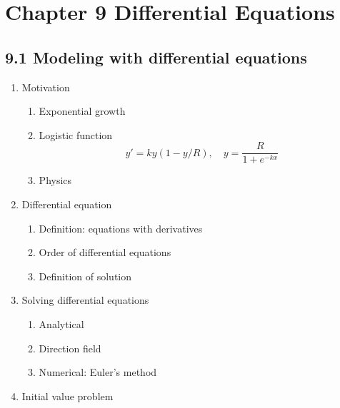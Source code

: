 \documentclass{article}
\begin{document}
\section{Chapter 9 Differential Equations}
\subsection{9.1 Modeling with differential equations}
\begin{enumerate}
\item Motivation
\begin{enumerate}
\item Exponential growth
\item Logistic function
$$
y' = ky(1-y/R),\quad y = \frac{R}{1+e^{-kx}}
$$
\item Physics
\end{enumerate}
\item Differential equation
\begin{enumerate}
\item Definition: equations with derivatives
\item Order of differential equations
\item Definition of solution
\end{enumerate}
\item Solving differential equations
\begin{enumerate}
\item Analytical
\item Direction field
\item Numerical: Euler's method
\end{enumerate}
\item Initial value problem
\end{enumerate}
\end{document}
